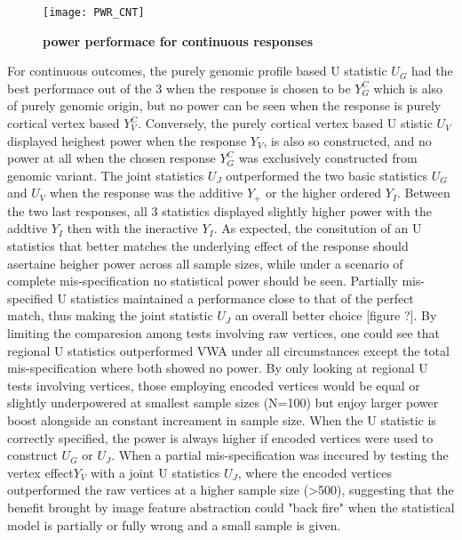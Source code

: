 \begin{figure}[h]
\centering
\texttt{[image: PWR\_CNT]}
\caption{\textbf{power performace for continuous responses}}
\label{fig:PWR_CNT}
\end{figure}

For continuous outcomes, the purely genomic profile based U statistic $U_G$ had the best performace out of the 3 when the response is chosen to be $Y_G^C$ which is also of purely genomic origin, but no power can be seen when the response is purely cortical vertex based $Y_V^C$. Conversely, the purely cortical vertex based U stistic $U_V$ displayed heighest power when the response $Y_V$, is also so constructed, and no power at all when the chosen response $Y_G^C$ was exclusively constructed from genomic variant. The joint statistics $U_J$ outperformed the two basic statistics $U_G$ and $U_V$ when the response was the additive $Y_+$ or the higher ordered $Y_I$. Between the two last responses, all 3 statistics displayed slightly higher power with the addtive $Y_I$ then with the ineractive $Y_I$. As expected, the consitution of an U statistics that better matches the underlying effect of the response should asertaine heigher power across all sample sizes, while under a scenario of complete mis-specification no statistical power should be seen. Partially mis-specified U statistics maintained a performance close to that of the perfect match, thus making the joint statistic $U_J$ an overall better choice [figure ?].
By limiting the comparesion among tests involving raw vertices, one could see that regional U statistics outperformed VWA under all circumstances except the total mis-specification where both showed no power. By only looking at regional U tests involving vertices, those employing encoded vertices would be equal or slightly underpowered at smallest sample sizes (N=100) but enjoy larger power boost alongside an constant increament in sample size. When the U statistic is correctly specified, the power is always higher if encoded vertices were used to construct $U_G$ or $U_J$. When a partial mis-specification was inccured by testing the vertex effect$Y_V$ with a joint U statistics $U_J$, where the encoded vertices outperformed the raw vertices at a higher sample size (>500), suggesting that the benefit brought by image feature abstraction could "back fire" when the statistical model is partially or fully wrong and a small sample is given. 

